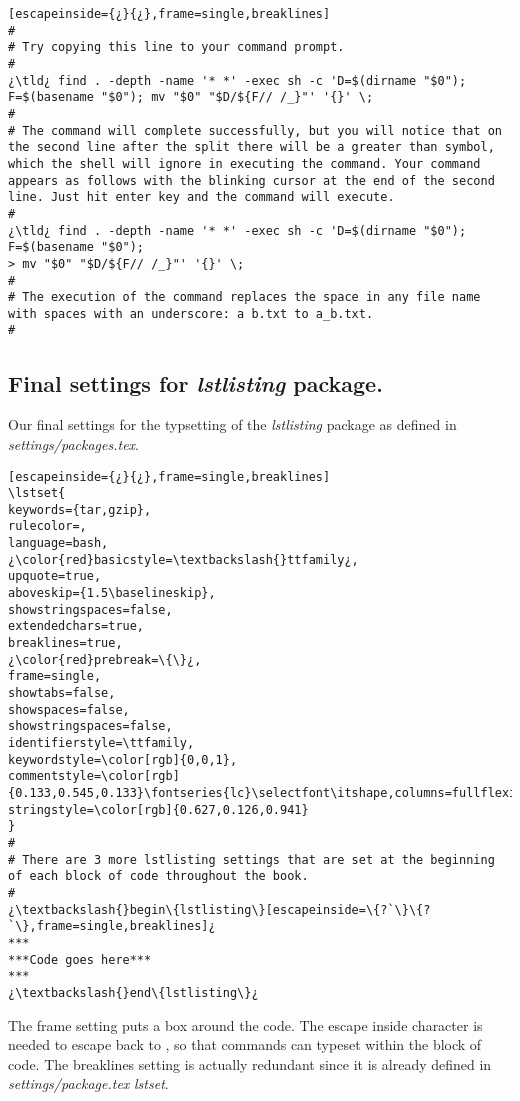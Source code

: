 \begin{lstlisting}[escapeinside={¿}{¿},frame=single,breaklines]
#
# Try copying this line to your command prompt. 
#
¿\tld¿ find . -depth -name '* *' -exec sh -c 'D=$(dirname "$0"); F=$(basename "$0"); mv "$0" "$D/${F// /_}"' '{}' \;
#
# The command will complete successfully, but you will notice that on the second line after the split there will be a greater than symbol, which the shell will ignore in executing the command. Your command appears as follows with the blinking cursor at the end of the second line. Just hit enter key and the command will execute.
# 
¿\tld¿ find . -depth -name '* *' -exec sh -c 'D=$(dirname "$0"); F=$(basename "$0"); 
> mv "$0" "$D/${F// /_}"' '{}' \;
#
# The execution of the command replaces the space in any file name with spaces with an underscore: a b.txt to a_b.txt.
#
\end{lstlisting}

\subsection{Final settings for \latex \emph{lstlisting} package.}
	
Our final settings for the typsetting of the \emph{lstlisting} package as defined in \textsl{settings/packages.tex}.

\begin{lstlisting}[escapeinside={¿}{¿},frame=single,breaklines]
\lstset{
keywords={tar,gzip},
rulecolor=,
language=bash,
¿\color{red}basicstyle=\textbackslash{}ttfamily¿,
upquote=true,
aboveskip={1.5\baselineskip},
showstringspaces=false,
extendedchars=true,
breaklines=true,
¿\color{red}prebreak=\{\}¿,
frame=single,
showtabs=false,
showspaces=false,
showstringspaces=false,
identifierstyle=\ttfamily,
keywordstyle=\color[rgb]{0,0,1},
commentstyle=\color[rgb]{0.133,0.545,0.133}\fontseries{lc}\selectfont\itshape,columns=fullflexible,
stringstyle=\color[rgb]{0.627,0.126,0.941}
}
#
# There are 3 more lstlisting settings that are set at the beginning of each block of code throughout the book.
#
¿\textbackslash{}begin\{lstlisting\}[escapeinside=\{?`\}\{?`\},frame=single,breaklines]¿
***
***Code goes here***
***
¿\textbackslash{}end\{lstlisting\}¿
\end{lstlisting}

The frame setting puts a box around the code. The escape inside character is needed to escape back to \latex, so that \latex commands can typeset within the block of code. The breaklines setting is actually redundant since it is already defined in \textsl{settings/package.tex} \emph{lstset}.

